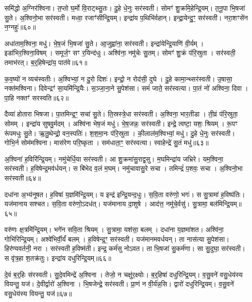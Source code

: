 समि॑द्धो अ॒ग्निर॑श्विना।
त॒प्तो घ॒र्मो वि॒राट्थ्सु॒तः।
दु॒हे धे॒नुः सर॑स्वती।
सोमꣳ॑ शु॒क्रमि॒हेन्द्रि॒यम्।
त॒नू॒पा भि॒षजा॑ सु॒ते।
अ॒श्विनो॒भा सर॑स्वती।
मध्वा॒ रजाꣳ॑सीन्द्रि॒यम्।
इन्द्रा॑य प॒थिभि॑र्वहान्।
इन्द्रा॒येन्दु॒ꣳ॒ सर॑स्वती।
नरा॒शꣳसे॑न न॒ग्नहुः॑॥६०॥

अधा॑ताम॒श्विना॒ मधु॑।
भे॒ष॒जं भि॒षजा॑ सु॒ते।
आ॒जुह्वा॑ना॒ सर॑स्वती।
इन्द्रा॑येन्द्रि॒याणि॑ वी॒र्यम्।
इडा॑भिर॒श्विना॒विषम्।
समूर्ज॒ꣳ सꣳ र॒यिन्द॑धुः।
अश्वि॑ना॒ नमु॑चेः सु॒तम्।
सोमꣳ॑ शु॒क्रं प॑रि॒स्रुता।
सर॑स्वती॒ तमाभ॑रत्।
ब॒र्॒हिषेन्द्रा॑य॒ पात॑वे॥६१॥

क॒व॒ष्यो॑ न व्यच॑स्वतीः।
अ॒श्विभ्यां॒ न दु॒रो दिशः॑।
इन्द्रो॒ न रोद॑सी॒ दुघे।
दु॒हे कामा॒न्थ्सर॑स्वती।
उ॒षासा॒ नक्त॑मश्विना।
दिवेन्द्रꣳ॑ सा॒यमि॑न्द्रि॒यैः।
स॒ञ्जा॒ना॒ने सु॒पेश॑सा।
समं॑ जाते॒ सर॑स्वत्या।
पा॒तं नो॑ अश्विना॒ दिवा।
पा॒हि नक्तꣳ॑ सरस्वति॥६२॥

दैव्या॑ होतारा भिषजा।
पा॒तमिन्द्र॒ꣳ॒ सचा॑ सु॒ते।
ति॒स्रस्त्रे॒धा सर॑स्वती।
अ॒श्विना॒ भार॒तीडा।
ती॒व्रं प॑रि॒स्रुता॒ सोमम्।
इन्द्रा॑य सुषवु॒र्मदम्।
अश्वि॑ना भेष॒जं मधु॑।
भे॒ष॒जन्नः॒ सर॑स्वती।
इन्द्रे॒ त्वष्टा॒ यशः॒ श्रियम्।
रू॒पꣳ रू॑पमधुः सु॒ते।
ऋ॒तु॒थेन्द्रो॒ वन॒स्पतिः॑।
श॒श॒मा॒नः प॑रि॒स्रुता।
की॒लाल॑म॒श्विभ्यां॒ मधु॑।
दु॒हे धे॒नुः सर॑स्वती।
गोभि॒र्न सोम॑मश्विना।
मास॑रेण परि॒ष्कृता।
सम॑धाता॒ꣳ॒ सर॑स्वत्या।
स्वाहेन्द्रे॑ सु॒तं मधु॑॥६३॥\anuvakamend[न॒ग्नहुः॒ पात॑वे सरस्वत्यधुः सु॒ते\-ऽष्टौ च॑]

अ॒श्विना॑ ह॒विरि॑न्द्रि॒यम्।
नमु॑चेर्धि॒या सर॑स्वती।
आ शु॒क्रमा॑सु॒राद्व॒सु।
म॒घमिन्द्रा॑य जभ्रिरे।
यम॒श्विना॒ सर॑स्वती।
ह॒विषेन्द्र॒मव॑र्धयन्।
स बि॑भेद व॒लं म॒घम्।
नमु॑चावासु॒रे सचा।
तमिन्द्रं॑ प॒शवः॒ सचा।
अ॒श्विनो॒भा सर॑स्वती॥६४॥

दधा॑ना अ॒भ्य॑नूषत।
ह॒विषा॑ य॒ज्ञमि॑न्द्रि॒यम्।
य इन्द्र॑ इन्द्रि॒यन्द॒धुः।
स॒वि॒ता वरु॑णो॒ भगः॑।
स सु॒त्रामा॑ ह॒विष्प॑तिः।
यज॑मानाय सश्चत।
स॒वि॒ता वरु॑णो॒\-ऽदध॑त्।
यज॑मानाय दा॒शुषे।
आद॑त्त॒ नमु॑चे॒र्वसु॑।
सु॒त्रामा॒ बल॑मिन्द्रि॒यम्॥६५॥

वरु॑णः क्ष॒त्रमि॑न्द्रि॒यम्।
भगे॑न सवि॒ता श्रियम्।
सु॒त्रामा॒ यश॑सा॒ बलम्।
दधा॑ना य॒ज्ञमा॑शत।
अश्वि॑ना॒ गोभि॑रिन्द्रि॒यम्।
अश्वे॑भिर्वी॒र्यं॑ बलम्।
ह॒विषेन्द्र॒ꣳ॒ सर॑स्वती।
यज॑मानमवर्धयन्।
ता नास॑त्या सु॒पेश॑सा।
हिर॑ण्यवर्तनी॒ नरा।
सर॑स्वती ह॒विष्म॑ती।
इन्द्र॒ कर्म॑सु नोऽवत।
ता भि॒षजा॑ सु॒कर्म॑णा।
सा सु॒दुघा॒ सर॑स्वती।
स वृ॑त्र॒हा श॒तक्र॑तुः।
इन्द्रा॑य दधुरिन्द्रि॒यम्॥६६॥\anuvakamend[उ॒भा सर॑स्वती॒ बल॑मिन्द्रि॒यन्नरा॒ षट्च॑]

दे॒वं ब॒र्॒हिः स॑रस्वती।
सु॒दे॒वमिन्द्रे॑ अ॒श्विना।
तेजो॒ न चक्षु॑र॒क्ष्योः।
ब॒र्॒हिषा॑ दधुरिन्द्रि॒यम्।
व॒सु॒वने॑ वसु॒धेय॑स्य वियन्तु॒ यज॑।
दे॒वीर्द्वारो॑ अ॒श्विना।
भि॒षजेन्द्रे॒ सर॑स्वती।
प्रा॒णं न वी॒र्य॑न्न॒सि।
द्वारो॑ दधुरिन्द्रि॒यम्।
व॒सु॒वने॑ वसु॒धेय॑स्य वियन्तु॒ यज॑॥६७॥

